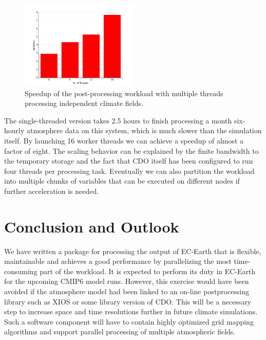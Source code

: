 \documentclass[procedia]{easychair}
\begin{document}
\begin{figure}[b]
 \centering
 \includegraphics[width=0.5\textwidth]{speedup_chart.png}
 \caption{Speedup of the post-processing workload with multiple threads 
processing independent climate fields.}
\end{figure}

The single-threaded version takes 2.5 hours to finish processing a month 
six-hourly atmosphere data on this system, which is much slower than the 
simulation itself. By launching 16 worker threads we can achieve a speedup of 
almost a factor of eight. The scaling behavior can be explained by the finite 
bandwidth to the temporary storage and the fact that CDO itself has been 
configured to run four threads per processing task. Eventually we can also 
partition the workload into multiple chunks of variables that can be executed 
on different nodes if further acceleration is needed.
\section{Conclusion and Outlook}
We have written a package for processing the output of EC-Earth that is 
flexible, maintainable and achieves a good performance by parallelizing the 
most time-consuming part of the workload. It is expected to perform its duty in 
EC-Earth for the upcoming CMIP6 model runs. However, this exercise would have 
been avoided if the atmosphere model had been linked to an on-line 
postprocessing library such as XIOS or some library version of CDO. This will 
be a necessary step to increase space and time resolutions further in future 
climate simulations. Such a software component will have to contain highly 
optimized grid mapping algorithms and support parallel processing of multiple 
atmospheric fields.

%
\label{sect:bib}

%
%
%


\end{document}
